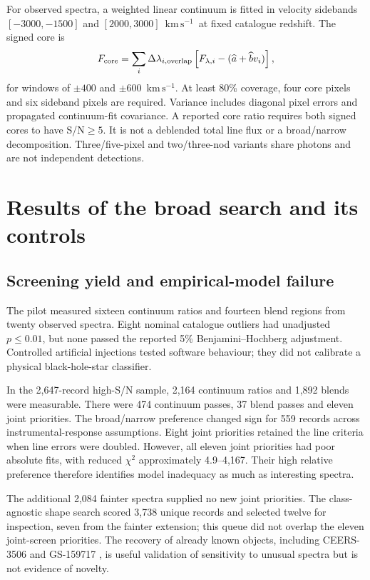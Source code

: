 \documentclass[11pt,a4paper]{article}
\newcommand{\kms}{\ensuremath{\mathrm{km\,s^{-1}}}}
\begin{document}
For observed spectra, a weighted linear continuum is fitted in velocity sidebands $[-3000,-1500]$ and $[2000,3000]$~\kms\ at fixed catalogue redshift. The signed core is
\begin{equation}
F_{\rm core}=\sum_i \Delta\lambda_{i,\rm overlap}
\left[F_{\lambda,i}-(\widehat{a}+\widehat{b}v_i)\right],
\end{equation}
for windows of $\pm400$ and $\pm600$~\kms. At least 80\% coverage, four core pixels and six sideband pixels are required. Variance includes diagonal pixel errors and propagated continuum-fit covariance. A reported core ratio requires both signed cores to have S/N$\ge5$. It is not a deblended total line flux or a broad/narrow decomposition. Three/five-pixel and two/three-nod variants share photons and are not independent detections.

\section{Results of the broad search and its controls}
\subsection{Screening yield and empirical-model failure}
The pilot measured sixteen continuum ratios and fourteen blend regions from twenty observed spectra. Eight nominal catalogue outliers had unadjusted $p\le0.01$, but none passed the reported 5\% Benjamini--Hochberg adjustment. Controlled artificial injections tested software behaviour; they did not calibrate a physical black-hole-star classifier.

In the 2,647-record high-S/N sample, 2,164 continuum ratios and 1,892 blends were measurable. There were 474 continuum passes, 37 blend passes and eleven joint priorities. The broad/narrow preference changed sign for 559 records across instrumental-response assumptions. Eight joint priorities retained the line criteria when line errors were doubled. However, all eleven joint priorities had poor absolute fits, with reduced $\chi^2$ approximately 4.9--4,167. Their high relative preference therefore identifies model inadequacy as much as interesting spectra.

The additional 2,084 fainter spectra supplied no new joint priorities. The class-agnostic shape search scored 3,738 unique records and selected twelve for inspection, seven from the fainter extension; this queue did not overlap the eleven joint-screen priorities. The recovery of already known objects, including CEERS-3506 \cite{zhu} and GS-159717 \cite{deugenio}, is useful validation of sensitivity to unusual spectra but is not evidence of novelty.
\end{document}
